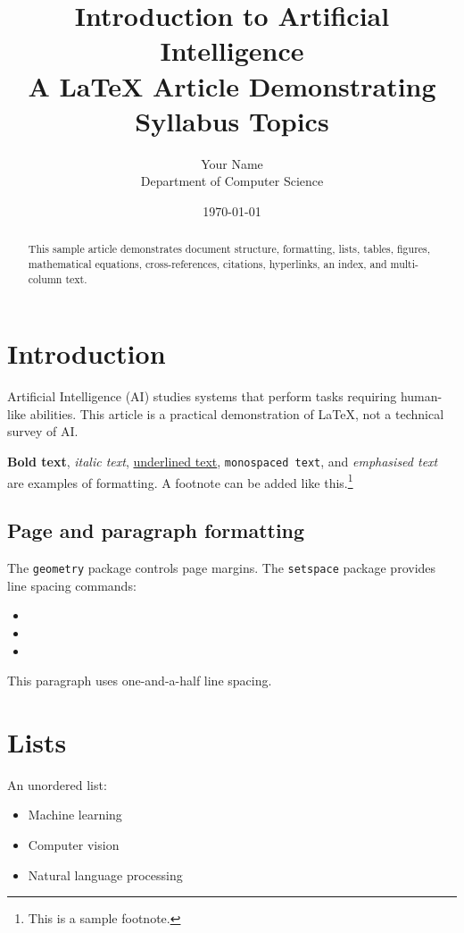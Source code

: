 \documentclass[12pt,a4paper]{article}
\title{\textbf{Introduction to Artificial Intelligence}\\
       \large A LaTeX Article Demonstrating Syllabus Topics}
\author{Your Name\\Department of Computer Science}
\date{\today}
\begin{document}
\maketitle

\begin{abstract}
This sample article demonstrates document structure, formatting, lists,
tables, figures, mathematical equations, cross-references, citations,
hyperlinks, an index, and multi-column text.
\end{abstract}

\tableofcontents
\listoffigures
\listoftables
\newpage

\section{Introduction}\label{sec:intro}
Artificial Intelligence (AI) studies systems that perform tasks requiring
human-like abilities. This article is a practical demonstration of
LaTeX, not a technical survey of AI.

\textbf{Bold text}, \textit{italic text}, \underline{underlined text},
\texttt{monospaced text}, and \emph{emphasised text} are examples of
formatting. A footnote can be added like this.\footnote{This is a sample
footnote.}

\subsection{Page and paragraph formatting}
The \texttt{geometry} package controls page margins. The
\texttt{setspace} package provides line spacing commands:
\begin{itemize}[label=\textbullet,leftmargin=2em]
  \item \texttt{\string\singlespacing}
  \item \texttt{\string\onehalfspacing}
  \item \texttt{\string\doublespacing}
\end{itemize}
\onehalfspacing
This paragraph uses one-and-a-half line spacing.
\singlespacing

\section{Lists}\label{sec:lists}
An unordered list:
\begin{itemize}
  \item Machine learning
  \item Computer vision
  \item Natural language processing
\end{itemize}
\end{document}
